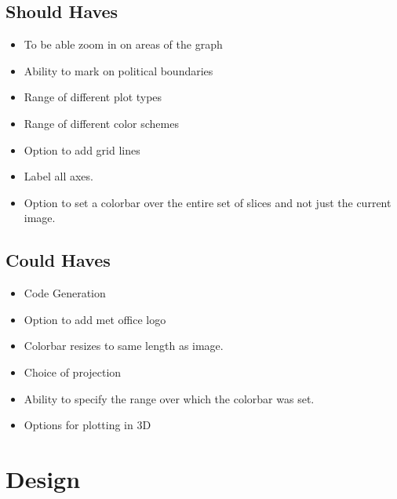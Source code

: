 \documentclass[whitecover]{MO_report}
\begin{document}
\section{Should Haves}

\begin{itemize}

\item
To be able zoom in on areas of the graph

\item
Ability to mark on political boundaries

\item
Range of different plot types

\item
Range of different color schemes

\item
Option to add grid lines

\item
Label all axes.

\item
Option to set a colorbar over the entire set of slices and not just the current
image.


\end{itemize}

\section{Could Haves}

\begin{itemize}

\item
Code Generation

\item
Option to add met office logo

\item
Colorbar resizes to same length as image.

\item
Choice of projection

\item
Ability to specify the range over which the colorbar was set.

\item
Options for plotting in 3D

\end{itemize}


\pagebreak


\chapter{Design}
\end{document}
